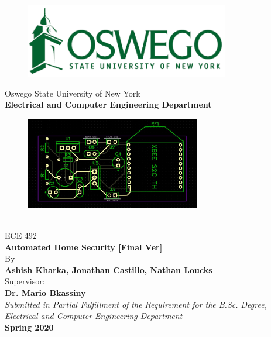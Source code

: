 \begin{center}
	\begin{figure}[h]
		\centering
		\includegraphics[width=3.5in]{oswegoHead.png}
	\end{figure}
	\vspace{0.5in}
	\Large
	Oswego State University of New York \\ 
	\textbf{Electrical and Computer Engineering Department}
	\vspace{0.5in}
	\begin{figure}[h]
		\centering
		\includegraphics[width=3in]{power supply pcb w xbee.JPG}
	\end{figure}\\
	\Huge ECE 492 \\
	\textbf{Automated Home Security [Final Ver]}\\

	\vspace{1in}
	\normalsize
	By \\
	\Large \textbf{Ashish Kharka, Jonathan Castillo, Nathan Loucks} \\ 
	\vspace{0.5in}
	\normalsize Supervisor:\\
	\Large\textbf{Dr. Mario Bkassiny} \\
	\vspace{0.5in}
	\normalsize\textit{
		Submitted in Partial Fulfillment of the Requirement for the B.Sc. Degree, 	\\Electrical and Computer Engineering Department
		} \\
	\vspace{0.5in}
	\Large\textbf{Spring 2020}
\end{center}